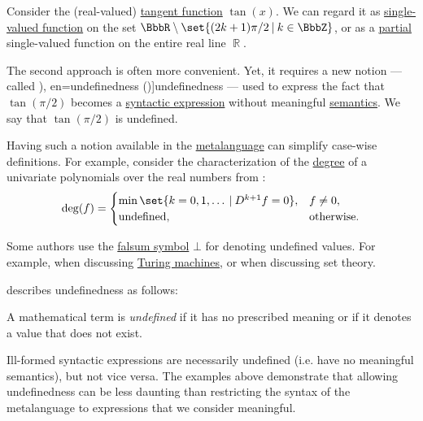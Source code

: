 \begin{concept}\label{con:undefinedness}\mimprovised
  Consider the (real-valued) \hyperref[def:derived_trigonometric_functions/tan]{tangent function} \( \tan(x) \). We can regard it as \hyperref[def:function]{single-valued function} on the set \( \BbbR \setminus \set{ (2k + 1) \pi / 2 \given k \in \BbbZ } \), or as a \hyperref[def:set_valued_map/partial]{partial} single-valued function on the entire real line \( \BbbR \).

  The second approach is often more convenient. Yet, it requires a new notion --- called \term[ru=неопределённость (\cite[62]{ШеньВерещагин2020НачалаТеорииМножеств}), en=undefinedness (\cite[284]{Farmer2008STTVirtues})]{undefinedness} --- used to express the fact that \( \tan(\pi / 2) \) becomes a \hyperref[con:expression]{syntactic expression} without meaningful \hyperref[con:syntax_and_semantics]{semantics}. We say that \( \tan(\pi / 2) \) is undefined.

  Having such a notion available in the \hyperref[def:metalogic]{metalanguage} can simplify case-wise definitions. For example, consider the characterization of the \hyperref[def:polynomial_degree]{degree} of a univariate polynomials over the real numbers from :
  \begin{equation*}
    \deg(f) = \begin{cases}
      \min\set{ k = 0, 1, \ldots \given D^{k+1} f = 0 }, &f \neq 0, \\
      \T{undefined},                                     &\T{otherwise.}
    \end{cases}
  \end{equation*}
\end{concept}
\begin{comments}
  \item Some authors use the \hyperref[def:propositional_alphabet/constants/falsum]{falsum symbol} \( \bot \) for denoting undefined values. For example,  when discussing \hyperref[def:turing_machine]{Turing machines}, or  when discussing set theory.

  \item {} describes undefinedness as follows:
  \begin{displayquote}
    A mathematical term is \textit{undeﬁned} if it has no prescribed meaning or if it denotes a value that does not exist.
  \end{displayquote}

  \item Ill-formed syntactic expressions are necessarily undefined (i.e. have no meaningful semantics), but not vice versa. The examples above demonstrate that allowing undefinedness can be less daunting than restricting the syntax of the metalanguage to expressions that we consider meaningful.
\end{comments}

